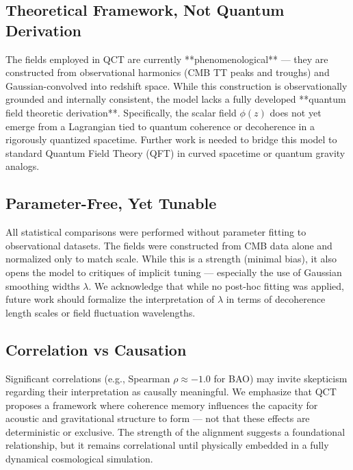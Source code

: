 \documentclass[12pt]{article}
\begin{document}
	\subsection*{Theoretical Framework, Not Quantum Derivation}
	The fields employed in QCT are currently **phenomenological** — they are constructed from observational harmonics (CMB TT peaks and troughs) and Gaussian-convolved into redshift space. While this construction is observationally grounded and internally consistent, the model lacks a fully developed **quantum field theoretic derivation**. Specifically, the scalar field \( \phi(z) \) does not yet emerge from a Lagrangian tied to quantum coherence or decoherence in a rigorously quantized spacetime. Further work is needed to bridge this model to standard Quantum Field Theory (QFT) in curved spacetime or quantum gravity analogs.
	
	\subsection*{Parameter-Free, Yet Tunable}
	All statistical comparisons were performed without parameter fitting to observational datasets. The fields were constructed from CMB data alone and normalized only to match scale. While this is a strength (minimal bias), it also opens the model to critiques of implicit tuning — especially the use of Gaussian smoothing widths $\lambda$. We acknowledge that while no post-hoc fitting was applied, future work should formalize the interpretation of $\lambda$ in terms of decoherence length scales or field fluctuation wavelengths.
	
	\subsection*{Correlation vs Causation}
	Significant correlations (e.g., Spearman \( \rho \approx -1.0 \) for BAO) may invite skepticism regarding their interpretation as causally meaningful. We emphasize that QCT proposes a framework where coherence memory influences the capacity for acoustic and gravitational structure to form — not that these effects are deterministic or exclusive. The strength of the alignment suggests a foundational relationship, but it remains correlational until physically embedded in a fully dynamical cosmological simulation.
	
\end{document}
